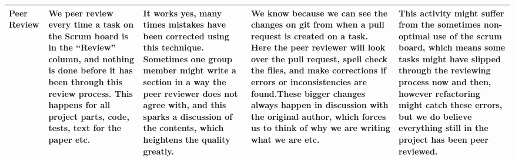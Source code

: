 \begin{sidewaystable}
\begin{tabularx}{\textwidth}{|l|X|X|X|X|}
Peer Review      & We peer review every time a task on the Scrum board is in the “Review” column, and nothing is done before it has been through this review process. This happens for all project parts, code, tests, text for the paper etc. & It works yes, many times mistakes have been corrected using this technique. Sometimes one group member might write a section in a way the peer reviewer does not agree with, and this sparks a discussion of the contents, which heightens the quality greatly. & We know because we can see the changes on git from when a pull request is created on a task. Here the peer reviewer will look over the pull request, spell check the files, and make corrections if errors or inconsistencies are found.These bigger changes always happen in discussion with the original author, which forces us to think of why we are writing what we are etc. & This activity might suffer from the sometimes non-optimal use of the scrum board, which means some tasks might have slipped through the reviewing process now and then, however refactoring might catch these errors, but we do believe everything still in the project has been peer reviewed. \\ \hline
\end{tabularx}
\end{sidewaystable}